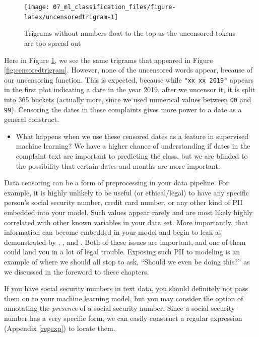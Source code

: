 \documentclass[
]{krantz}
\newenvironment{rmdblock}[1]
  {\begin{shaded*}
  \begin{itemize}[left = -1cm, labelsep = 1cm]
  \renewcommand{\labelitemi}{
    \raisebox{-.7\height}[0pt][0pt]{
      {\setkeys{Gin}{width=3em,keepaspectratio}\texttt{[image: images/\#1]}}
    }
  }
 
  \item
  }
  {
  \end{itemize}
  \end{shaded*}
  }
\newenvironment{rmdwarning}
  {\begin{rmdblock}{warning}}
  {\end{rmdblock}}
\begin{document}
\begin{figure}

{\centering \texttt{[image: 07\_ml\_classification\_files/figure-latex/uncensoredtrigram-1]} 

}

\caption{Trigrams without numbers float to the top as the uncensored tokens are too spread out}\label{fig:uncensoredtrigram}
\end{figure}

Here in Figure \ref{fig:uncensoredtrigram}, we see the same trigrams that appeared in Figure \ref{fig:censoredtrigram}.
However, none of the uncensored words appear, because of our uncensoring function.
This is expected, because while \texttt{"xx\ xx\ 2019"} appears in the first plot indicating a date in the year 2019, after we uncensor it, it is split into 365 buckets (actually more, since we used numerical values between \texttt{00} and \texttt{99}).
Censoring the dates in these complaints gives more power to a date as a general construct.

\begin{rmdwarning}
What happens when we use these censored dates as a feature in supervised
machine learning? We have a higher chance of understanding if dates in
the complaint text are important to predicting the class, but we are
blinded to the possibility that certain dates and months are more
important.
\end{rmdwarning}

Data censoring can be a form of preprocessing in your data pipeline.
For example, it is highly unlikely to be useful (or ethical/legal) to have any specific person's social security number, credit card number, or any other kind of PII embedded into your model. Such values appear rarely and are most likely highly correlated with other known variables in your data set.
More importantly, that information can become embedded in your model and begin to leak as demonstrated by \citet{carlini2018secret}, \citet{Fredrikson2014}, and \citet{Fredrikson2015}.
Both of these issues are important, and one of them could land you in a lot of legal trouble.
Exposing such PII to modeling is an example of where we should all stop to ask, ``Should we even be doing this?'' as we discussed in the foreword to these chapters.

If you have social security numbers in text data, you should definitely not pass them on to your machine learning model, but you may consider the option of annotating the \emph{presence} of a social security number.
Since a social security number has a very specific form, we can easily construct a regular expression (Appendix \ref{regexp}) to locate them.
\end{document}

